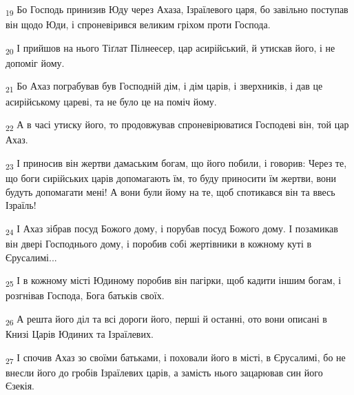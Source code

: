 \begin{tcolorbox}
\textsubscript{19} Бо Господь принизив Юду через Ахаза, Ізраїлевого царя, бо завільно поступав він щодо Юди, і спроневірився великим гріхом проти Господа.
\end{tcolorbox}
\begin{tcolorbox}
\textsubscript{20} І прийшов на нього Тіґлат Пілнеесер, цар асирійський, й утискав його, і не допоміг йому.
\end{tcolorbox}
\begin{tcolorbox}
\textsubscript{21} Бо Ахаз пограбував був Господній дім, і дім царів, і зверхників, і дав це асирійському цареві, та не було це на поміч йому.
\end{tcolorbox}
\begin{tcolorbox}
\textsubscript{22} А в часі утиску його, то продовжував спроневірюватися Господеві він, той цар Ахаз.
\end{tcolorbox}
\begin{tcolorbox}
\textsubscript{23} І приносив він жертви дамаським богам, що його побили, і говорив: Через те, що боги сирійських царів допомагають їм, то буду приносити їм жертви, вони будуть допомагати мені! А вони були йому на те, щоб спотикався він та ввесь Ізраїль!
\end{tcolorbox}
\begin{tcolorbox}
\textsubscript{24} І Ахаз зібрав посуд Божого дому, і порубав посуд Божого дому. І позамикав він двері Господнього дому, і поробив собі жертівники в кожному куті в Єрусалимі...
\end{tcolorbox}
\begin{tcolorbox}
\textsubscript{25} І в кожному місті Юдиному поробив він пагірки, щоб кадити іншим богам, і розгнівав Господа, Бога батьків своїх.
\end{tcolorbox}
\begin{tcolorbox}
\textsubscript{26} А решта його діл та всі дороги його, перші й останні, ото вони описані в Книзі Царів Юдиних та Ізраїлевих.
\end{tcolorbox}
\begin{tcolorbox}
\textsubscript{27} І спочив Ахаз зо своїми батьками, і поховали його в місті, в Єрусалимі, бо не внесли його до гробів Ізраїлевих царів, а замість нього зацарював син його Єзекія.
\end{tcolorbox}
